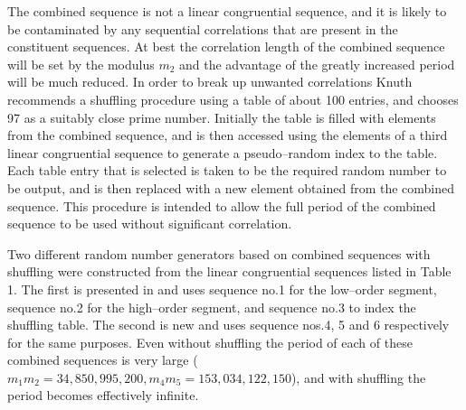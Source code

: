 \documentclass[dvips]{article}
\begin{document}
The combined sequence
is not a linear congruential sequence, and it is likely to be contaminated by
any sequential correlations that are present in the constituent sequences.  At
best the correlation length of the combined sequence will be set by the
modulus $m_{2}$ and the advantage of the greatly increased period will
be much reduced.  In order to break up unwanted correlations
Knuth recommends a shuffling procedure using a table of about 100
entries, and chooses 97 as a suitably close prime number.  Initially the
table is filled with elements from the combined sequence, and is
then accessed using the elements of a third linear congruential
sequence to generate a pseudo--random index to the table.  Each table entry that
is selected is taken to be the required random number to be output, and is
then replaced with a new element obtained from the combined sequence.
This procedure is intended to allow the full period of
the combined sequence to be used without significant correlation.

Two different random number generators based on combined sequences with
shuffling were
constructed from the linear congruential sequences listed in Table 1.
The first is presented in \cite{numrec} and uses sequence no.1 for the
low--order segment, sequence no.2 for the high--order segment, and
sequence no.3 to index the shuffling table.  The second is new and uses
sequence nos.4, 5 and 6 respectively for the same purposes.  Even
without shuffling the period of each of these combined sequences is very
large ($m_{1}m_{2}=34,850,995,200,m_{4}m_{5}=153,034,122,150$),
and with shuffling the period becomes effectively infinite.
\end{document}

